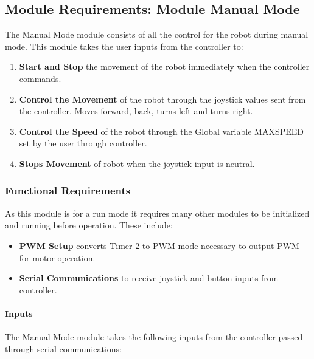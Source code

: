 \documentclass{article}
\begin{document}
	
	\subsection{Module Requirements: Module Manual Mode}
	
	The Manual Mode module consists of all the control for the robot during manual mode. This module takes the user inputs from the controller to:
	
	\begin{enumerate}
		\item \textbf{Start and Stop} the movement of the robot immediately when the controller commands.
		\item \textbf{Control the Movement} of the robot through the joystick values sent from the controller. Moves forward, back, turns left and turns right.
		\item \textbf{Control the Speed} of the robot through the Global variable MAX\textunderscore SPEED set by the user through controller.
		\item \textbf{Stops Movement} of robot when the joystick input is neutral.	
	\end{enumerate} 
	
	\subsubsection{Functional Requirements}
	As this module is for a run mode it requires many other modules to be initialized and running before operation. These include:
	
	\begin{itemize}
		\item \textbf{PWM Setup} converts Timer 2 to PWM mode necessary to output PWM for motor operation.
		\item \textbf{Serial Communications} to receive joystick and button inputs from controller.
	\end{itemize} 
	
	
	\paragraph{Inputs}
	
	The Manual Mode module takes the following inputs from the controller passed through serial communications:
	
\end{document}
